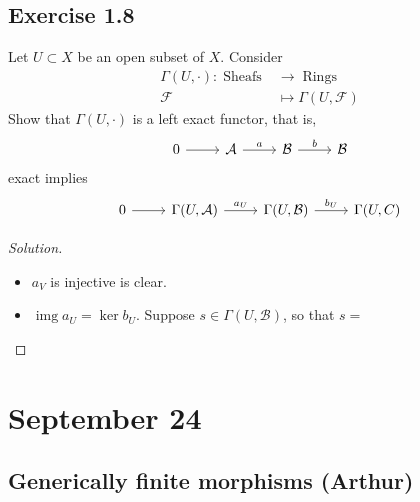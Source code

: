 \subsection{Exercise 1.8}
Let $U\subset X$ be an open subset of $X$. Consider
\begin{align*}
	\Gamma(U,\cdot): \operatorname{Sheafs} &\longrightarrow \operatorname{Rings} \\
	\mathcal{F} &\longmapsto \Gamma(U,\mathcal{F})
\end{align*}
Show that $\Gamma(U,\cdot)$ is a left exact functor, that is,
\[\begin{tikzcd}
	0\arrow[r]&\mathcal{A}\arrow[r,"a"]&\mathcal{B}\arrow[r,"b"]&\mathcal{B}
\end{tikzcd}\]
exact implies
\[\begin{tikzcd}
	0\arrow[r]&\Gamma(U,\mathcal{A})\arrow[r,"a_U"]&\Gamma(U,\mathcal{B})\arrow[r,"b_U"]&\Gamma(U,C)
\end{tikzcd}\]


 \begin{proof}[Solution]\leavevmode
 	\begin{itemize}
 	\item $a_V$ is injective is clear.
	\item $ \operatorname{img}a_U=\ker b_U$. Suppose $s \in\Gamma(U,\mathcal{B})$, so that $s =$
 	\end{itemize}
 \end{proof}

\section{September 24}

\subsection{Generically finite morphisms (Arthur)}

\begin{manualexercise}{3.7}
	
\end{manualexercise}

